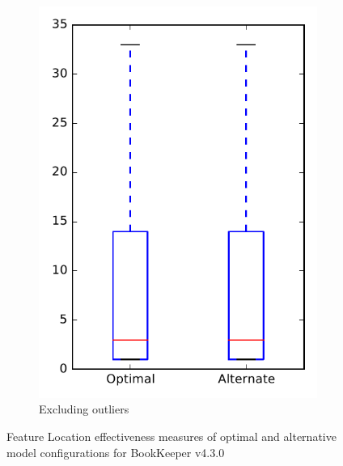 \begin{figure}
\begin{subfigure}{.4\textwidth}
        \includegraphics[height=0.4\textheight]{figures/combo/flt_rq1_bookkeeper_no_outlier}
        \caption{Excluding outliers}\label{fig:combo:flt:rq1:bookkeeper_no_outlier}
    \end{subfigure}
\caption{Feature Location effectiveness measures of optimal and alternative model configurations for BookKeeper v4.3.0}
\label{fig:combo:flt:rq1:bookkeeper}
\end{figure}
